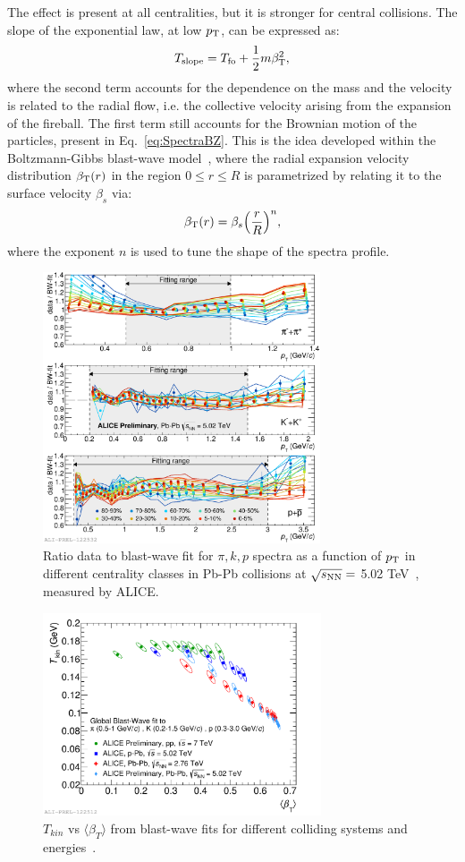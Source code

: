   The effect is present at all centralities, but it is stronger for central
   collisions. The slope of the exponential law, at low $p_{\rm T}$, can be expressed as:
\begin{equation}
\label{eq:Tslope}
T_{\rm slope} = T_{\rm fo} + \frac{1}{2}m \beta_{\rm T}^{2},
\end{equation}
where the second term accounts for the dependence on the mass 
and the velocity is related to the radial flow, i.e. the collective velocity
 arising from the expansion of the fireball. The first term still accounts
  for the Brownian motion of the particles, present in Eq.~\ref{eq:SpectraBZ}.
   This is the idea developed within the Boltzmann-Gibbs blast-wave 
   model~\cite{Schnedermann:1993ws}, where the radial expansion 
   velocity distribution $\beta_{\rm T}(r)$ in the region \mbox{$0 \leq r \leq R$} 
   is parametrized by relating it to the surface velocity $\beta_s$ via:
\begin{equation}
\label{eq:Br}
\beta_{\rm T} (r) = \beta_s \Big(\frac{r}{R}\Big )^n,
\end{equation}
where the exponent $n$ is used to tune the shape of the spectra profile.
\begin{figure}[!t]
  \centering
   \includegraphics[height=8cm]{FigCap1/BW_5TeV.pdf}
 \caption{Ratio data to blast-wave fit for $\pi, k, p$ spectra as a function of $p_{\rm T}$ in different centrality classes in Pb-Pb collisions at $\sqrt{s_{\rm NN}} = $ 5.02 TeV~\cite{Jacazio:2017dvy}, measured by ALICE.}
  \label{fig:BWfit}
\end{figure}
\begin{figure}[!t]
  \centering
  \includegraphics[height=6cm]{FigCap1/BWfit_BetaTplot.pdf}
 \caption{$T_{kin}$ vs $\langle \beta_T \rangle$ from blast-wave fits for different colliding systems and energies~\cite{Jacazio:2017dvy}.}
  \label{fig:BetaTplot}
\end{figure}

